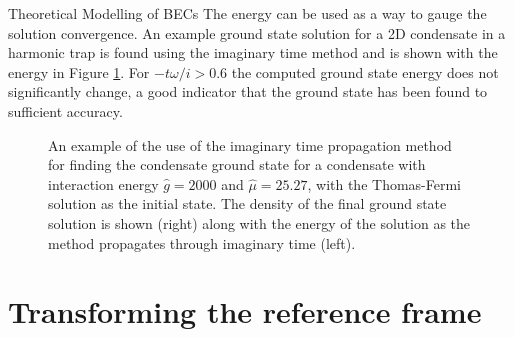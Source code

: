 \begin{chapter}{\label{cha:theoretical_model}Theoretical Modelling of BECs}
The energy can be used as a way to gauge the solution convergence. An example ground state solution for a 2D condensate in a harmonic trap is found using the imaginary time method and is shown with the energy in Figure \ref{fig_imagtimesolgs}. For $-t\omega/i > 0.6$ the computed ground state energy does not significantly change, a good indicator that the ground state has been found to sufficient accuracy.
\begin{figure}[!ht]
	\centering
  \hspace{0.04\linewidth}
	\caption{An example of the use of the imaginary time propagation method for finding the condensate ground state for a condensate with interaction energy $\hat{g}=2000$ and $\hat{\mu}=25.27$, with the Thomas-Fermi solution as the initial state. The density of the final ground state solution is shown (right) along with the energy of the solution as the method propagates through imaginary time (left).}\label{fig_imagtimesolgs}
\end{figure}

\section{\label{section:movframe} Transforming the reference frame}

\end{chapter}
